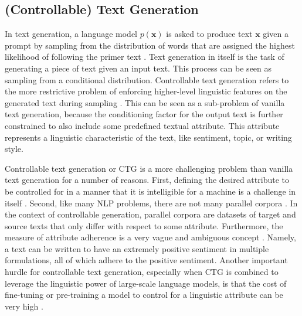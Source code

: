 \subsection{(Controllable) Text Generation}


In text generation, a language model $p(\textbf{x})$ is asked to produce text $\textbf{x}$ given a prompt by sampling from the distribution of words that are assigned the highest likelihood of following the primer text \citep{radford2019language}. Text generation in itself is the task of generating a piece of text given an input text. This process can be seen as sampling from a conditional distribution. Controllable text generation refers to the more restrictive problem of enforcing higher-level linguistic features on the generated text during sampling \citep{dathathri2019plug, prabhumoye-etal-2020-exploring}. This can be seen as a sub-problem of vanilla text generation, because the conditioning factor for the output text is further constrained to also include some predefined textual attribute. This attribute represents a linguistic characteristic of the text, like sentiment, topic, or writing style. 


Controllable text generation or CTG is a more challenging problem than vanilla text generation for a number of reasons. First, defining the desired attribute to be controlled for in a manner that it is intelligible for a machine is a challenge in itself \citep{zheng2019personalized}. Second, like many NLP problems, there are not many parallel corpora \citep{dai2019style}. In the context of controllable generation, parallel corpora are datasets of target and source texts that only differ with respect to some attribute. Furthermore, the measure of attribute adherence is a very vague and ambiguous concept \citep{dathathri2019plug, dai2019style}. Namely, a text can be written to have an extremely positive sentiment in multiple formulations, all of which adhere to the positive sentiment. Another important hurdle for controllable text generation, especially when CTG is combined to leverage the linguistic power of large-scale language models, is that the cost of fine-tuning or pre-training a model to control for a linguistic attribute can be very high \citep{dathathri2019plug, madotto-etal-2020-plug}. 

